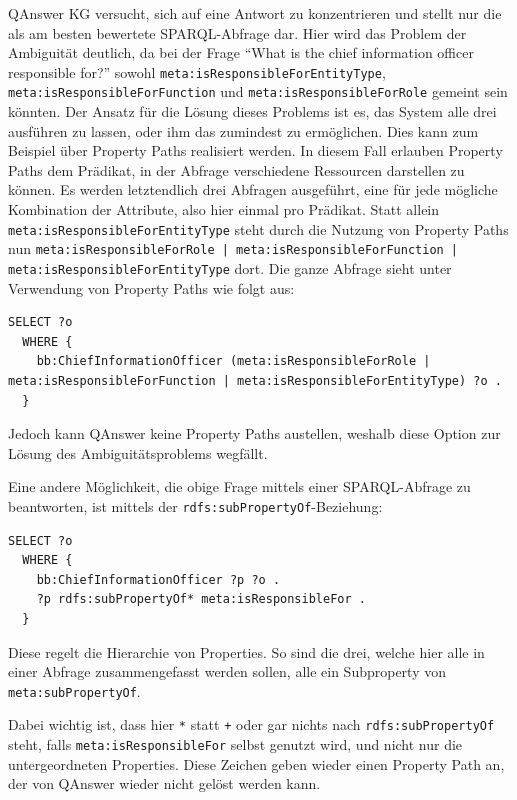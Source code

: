 \documentclass[utf8,biblatex]{lni}
\begin{document}
QAnswer KG versucht, sich auf eine Antwort zu konzentrieren und stellt nur die als am besten bewertete SPARQL-Abfrage dar.
Hier wird das Problem der Ambiguität deutlich, da bei der Frage \enquote{What is the chief information officer responsible for?} sowohl
\texttt{meta:isResponsibleForEntityType}, \texttt{meta:isResponsibleForFunction} und \texttt{meta:isResponsibleForRole} gemeint sein könnten.
Der Ansatz für die Lösung dieses Problems ist es, das System alle drei ausführen zu lassen, oder ihm das zumindest zu ermöglichen.
Dies kann zum Beispiel über Property Paths realisiert werden.
In diesem Fall erlauben Property Paths dem Prädikat, in der Abfrage verschiedene Ressourcen darstellen zu können.
Es werden letztendlich drei Abfragen ausgeführt, eine für jede mögliche Kombination der Attribute, also hier einmal pro Prädikat.
Statt allein \texttt{meta:isResponsibleForEntityType} steht durch die Nutzung von Property Paths nun \texttt{\texttt{meta:isResponsibleForRole} | \texttt{meta:isResponsibleForFunction} | \texttt{meta:isResponsibleForEntityType}} dort.
Die ganze Abfrage sieht unter Verwendung von Property Paths wie folgt aus:
\begin{lstlisting}[language=SPARQL]
  SELECT ?o
  WHERE {
    bb:ChiefInformationOfficer (meta:isResponsibleForRole | meta:isResponsibleForFunction | meta:isResponsibleForEntityType) ?o .
  }
\end{lstlisting}

Jedoch kann QAnswer keine Property Paths austellen, weshalb diese Option zur Lösung des Ambiguitätsproblems wegfällt.

Eine andere Möglichkeit, die obige Frage mittels einer SPARQL-Abfrage zu beantworten, ist mittels der \texttt{rdfs:subPropertyOf}-Beziehung:
\begin{lstlisting}[language=SPARQL]
  SELECT ?o
  WHERE {
    bb:ChiefInformationOfficer ?p ?o .
    ?p rdfs:subPropertyOf* meta:isResponsibleFor .
  }
\end{lstlisting}

Diese regelt die Hierarchie von Properties.
So sind die drei, welche hier alle in einer Abfrage zusammengefasst werden sollen, alle ein Subproperty von \texttt{meta:subPropertyOf}.

Dabei wichtig ist, dass hier \texttt{*} statt \texttt{+} oder gar nichts nach \texttt{rdfs:subPropertyOf} steht, falls \texttt{meta:isResponsibleFor} selbst genutzt wird,
und nicht nur die untergeordneten Properties.
Diese Zeichen geben wieder einen Property Path an, der von QAnswer wieder nicht gelöst werden kann.
\end{document}
